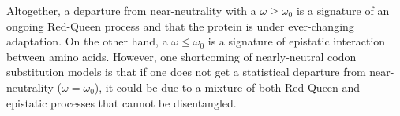 Altogether, a departure from near-neutrality with a $\omega \geq \omega_0$ is a signature of an ongoing Red-Queen process and that the protein is under ever-changing adaptation.
On the other hand, a $\omega \leq \omega_0$ is a signature of epistatic interaction between amino acids.
However, one shortcoming of nearly-neutral codon substitution models is that if one does not get a statistical departure from near-neutrality ($\omega = \omega_0$), it could be due to a mixture of both Red-Queen and epistatic processes that cannot be disentangled.